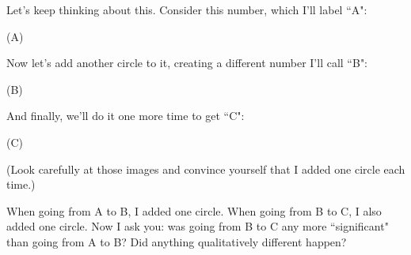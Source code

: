 Let's keep thinking about this. Consider this number, which I'll label
``A":
\begin{center}
  {\large (A)} \quad\quad {}
\end{center}
Now let's add another circle to it, creating a different number I'll call
``B":
\begin{center}
{\large (B)} \quad\quad
{}
\end{center}
And finally, we'll do it one more time to get ``C":
\begin{center}
{\large (C)} \quad\quad
{}
\end{center}
(Look carefully at those images and convince yourself that I added one
circle each time.)

When going from A to B, I added one circle. When going from B to C, I also
added one circle. Now I ask you: was going from B to C any more
``significant" than going from A to B? Did anything qualitatively different
happen? 

